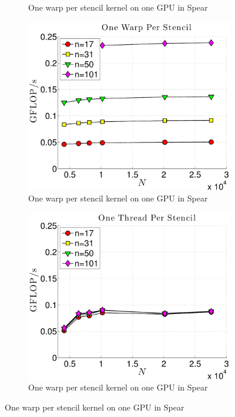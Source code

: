 \begin{figure}[htbp]
\begin{subfigure}[b]{0.425\textwidth}
\caption{One warp per stencil kernel on one GPU in Spear}
\label{fig:alltoall_1proc_warp}
\end{subfigure} 
\begin{subfigure}[b]{0.425\textwidth}
\includegraphics[width=1.0\textwidth]{../figures/spear_results/vortex/gflops_gpu_1proc_oneWarpPerStencil-eps-converted-to.pdf}
\caption{One warp per stencil kernel on one GPU in Spear}
\label{fig:alltoall_1proc_warp}
\end{subfigure} 
\begin{subfigure}[b]{0.425\textwidth}
\includegraphics[width=1.0\textwidth]{../figures/spear_results/vortex/gflops_gpu_1proc_oneThreadPerStencil-eps-converted-to.pdf}
\caption{One warp per stencil kernel on one GPU in Spear}
\label{fig:alltoall_1proc_warp}
\end{subfigure} 
\end{figure}

